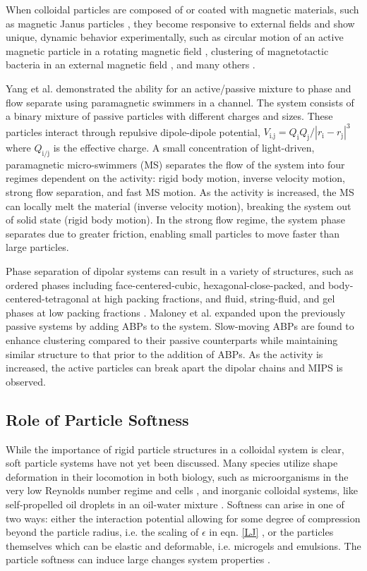 \documentclass[11pt]{article}
\begin{document}
When colloidal particles are composed of or coated with magnetic materials, such as magnetic Janus particles \cite{Ren}, they become responsive to external fields and show unique, dynamic behavior experimentally, such as circular motion of an active magnetic particle in a rotating magnetic field \cite{Cebers}, clustering of magnetotactic bacteria in an external magnetic field \cite{Rupprecht, Meng}, and many others \cite{Chen, Erb, Snezhko, Snezhko2}.  

Yang et al. \cite{Yang3} demonstrated the ability for an active/passive mixture to phase and flow separate using paramagnetic swimmers in a channel. The system consists of a binary mixture of passive particles with different charges and sizes. These particles interact through repulsive dipole-dipole potential, $V_\text{i,j}=Q_\text{i}Q_\text{j}/|r_\text{i}-r_\text{j}|^3$ where $Q_\text{i/j}$ is the effective charge.  A small concentration of light-driven, paramagnetic micro-swimmers (MS) separates the flow of the system into four regimes dependent on the activity: rigid body motion, inverse velocity motion, strong flow separation, and fast MS motion. As the activity is increased, the MS can locally melt the material (inverse velocity motion), breaking the system out of solid state (rigid body motion). In the strong flow regime, the system phase separates due to greater friction, enabling small particles to move faster than large particles. 

Phase separation of dipolar systems can result in a variety of structures, such as ordered phases including face-centered-cubic, hexagonal-close-packed, and body-centered-tetragonal at high packing fractions, and fluid, string-fluid, and gel phases at low packing fractions \cite{Goyal, Schmidle, Halsey}.  Maloney et al. \cite{Maloney} expanded upon the previously passive systems by adding ABPs to the system.  Slow-moving ABPs are found to enhance clustering compared to their passive counterparts while maintaining similar structure to that prior to the addition of ABPs.  As the activity is increased, the active particles can break apart the dipolar chains and MIPS is observed.

\subsection{Role of Particle Softness}\label{softnessmix}

While the importance of rigid particle structures in a colloidal system is clear, soft particle systems have not yet been discussed.  Many species utilize shape deformation in their locomotion in both biology, such as microorganisms in the very low Reynolds number regime \cite{Trouilloud} and cells \cite{Killich, Maeda}, and inorganic colloidal systems, like self-propelled oil droplets in an oil-water mixture \cite{Sumino}.   Softness can arise in one of two ways: either the interaction potential allowing for some degree of compression beyond the particle radius, i.e. the scaling of $\epsilon$ in eqn. \ref{LJ} \cite{Levis}, or the particles themselves which can be elastic and deformable, i.e. microgels and emulsions.  The particle softness can induce large changes system properties \cite{Seekell, Nigro, Mattsson, Nicoletta}. 
\end{document}
